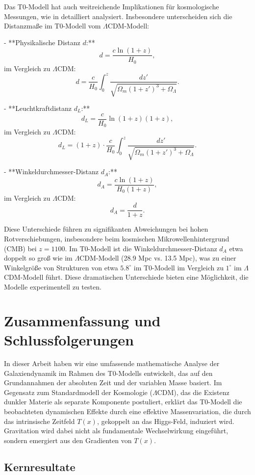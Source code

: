 \documentclass[a4paper,12pt]{article}
\newcommand{\Tfield}{T(x)}
\begin{document}
	Das T0-Modell hat auch weitreichende Implikationen für kosmologische Messungen, wie in \cite{pascher_messdifferenzen_2025} detailliert analysiert. Insbesondere unterscheiden sich die Distanzmaße im T0-Modell vom \( \Lambda \)CDM-Modell:
	
	- **Physikalische Distanz \( d \):**
	\[
	d = \frac{c \ln(1 + z)}{H_0},
	\]
	im Vergleich zu \( \Lambda \)CDM:
	\[
	d = \frac{c}{H_0} \int_0^z \frac{dz'}{\sqrt{\Omega_m (1 + z')^3 + \Omega_\Lambda}}.
	\]
	
	- **Leuchtkraftdistanz \( d_L \):**
	\[
	d_L = \frac{c}{H_0} \ln(1 + z) (1 + z),
	\]
	im Vergleich zu \( \Lambda \)CDM:
	\[
	d_L = (1 + z) \cdot \frac{c}{H_0} \int_0^z \frac{dz'}{\sqrt{\Omega_m (1 + z')^3 + \Omega_\Lambda}}.
	\]
	
	- **Winkeldurchmesser-Distanz \( d_A \):**
	\[
	d_A = \frac{c \ln(1 + z)}{H_0 (1 + z)},
	\]
	im Vergleich zu \( \Lambda \)CDM:
	\[
	d_A = \frac{d}{1 + z}.
	\]
	
	Diese Unterschiede führen zu signifikanten Abweichungen bei hohen Rotverschiebungen, insbesondere beim kosmischen Mikrowellenhintergrund (CMB) bei \( z = 1100 \). Im T0-Modell ist die Winkeldurchmesser-Distanz \( d_A \) etwa doppelt so groß wie im \( \Lambda \)CDM-Modell (28.9 Mpc vs. 13.5 Mpc), was zu einer Winkelgröße von Strukturen von etwa \( 5.8^\circ \) im T0-Modell im Vergleich zu \( 1^\circ \) im \( \Lambda \)CDM-Modell führt. Diese dramatischen Unterschiede bieten eine Möglichkeit, die Modelle experimentell zu testen.
	
	\section{Zusammenfassung und Schlussfolgerungen}
	
	In dieser Arbeit haben wir eine umfassende mathematische Analyse der Galaxiendynamik im Rahmen des T0-Modells entwickelt, das auf den Grundannahmen der absoluten Zeit und der variablen Masse basiert. Im Gegensatz zum Standardmodell der Kosmologie (\(\Lambda\)CDM), das die Existenz dunkler Materie als separate Komponente postuliert, erklärt das T0-Modell die beobachteten dynamischen Effekte durch eine effektive Massenvariation, die durch das intrinsische Zeitfeld \( \Tfield \), gekoppelt an das Higgs-Feld, induziert wird. Gravitation wird dabei nicht als fundamentale Wechselwirkung eingeführt, sondern emergiert aus den Gradienten von \( \Tfield \).
	
	\subsection{Kernresultate}
	
\end{document}
